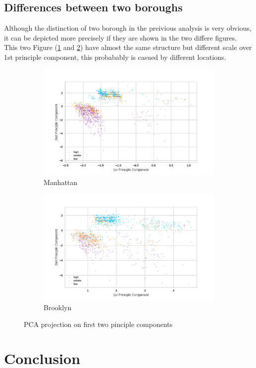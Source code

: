 \documentclass[12pt]{article}
\begin{document}
\subsection{Differences between two boroughs}
Although the distinction of two borough in the preivious analysis is very obvious, it can be depicted more precisely if they are shown in the two differe figures.\\
This two Figure (\ref{fig:pca3-1} and \ref{fig:pca3-2}) have almost the same structure but different scale over 1st principle component, this probabably is casued by different locations.
\begin{figure}
    \centering
    \begin{subfigure}[b]{0.47\textwidth}
        \includegraphics[width=\textwidth]{images/pca3-1.png}
        \caption{Manhattan}
        \label{fig:pca3-1}
    \end{subfigure}
    \begin{subfigure}[b]{0.47\textwidth}
        \includegraphics[width=\textwidth]{images/pca3-2.png}
        \caption{Brooklyn}
        \label{fig:pca3-2}
    \end{subfigure}
    \caption{PCA projection on first two pinciple components}\label{fig:pca3}
\end{figure} 
\section{Conclusion}

\newpage

\end{document}
